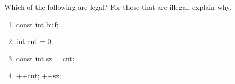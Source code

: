 %
%
\begin{question}
Which of the following are legal? For those that are illegal, explain why.
\begin{enumerate}[label=(\alph*)]
^^I\item const int buf;
^^I\item int cnt = 0;
^^I\item const int sz = cnt;
^^I\item ++cnt; ++sz;
\end{enumerate}
\end{question}
